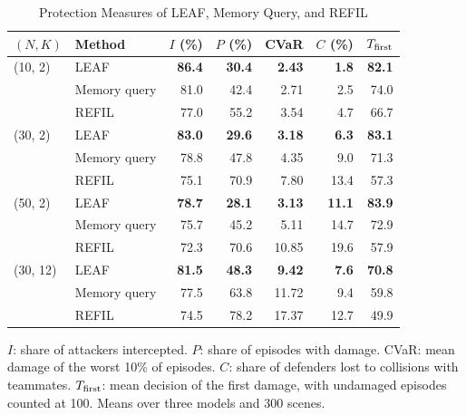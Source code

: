 \begin{table}[!t]
\centering
\scriptsize
\setlength{\tabcolsep}{2.6pt}
\caption{Protection Measures of LEAF, Memory Query, and REFIL}
\label{tab:s-protect}
\begin{tabular}{@{}llrrrrr@{}}
\toprule
$(N,K)$ & Method & $I$ (\%) & $P$ (\%) & CVaR & $C$ (\%) & $T_{\rm first}$\\
\midrule
(10, 2) & LEAF & \textbf{86.4} & \textbf{30.4} & \textbf{2.43} & \textbf{1.8} & \textbf{82.1}\\
 & Memory query & 81.0 & 42.4 & 2.71 & 2.5 & 74.0\\
 & REFIL & 77.0 & 55.2 & 3.54 & 4.7 & 66.7\\
(30, 2) & LEAF & \textbf{83.0} & \textbf{29.6} & \textbf{3.18} & \textbf{6.3} & \textbf{83.1}\\
 & Memory query & 78.8 & 47.8 & 4.35 & 9.0 & 71.3\\
 & REFIL & 75.1 & 70.9 & 7.80 & 13.4 & 57.3\\
(50, 2) & LEAF & \textbf{78.7} & \textbf{28.1} & \textbf{3.13} & \textbf{11.1} & \textbf{83.9}\\
 & Memory query & 75.7 & 45.2 & 5.11 & 14.7 & 72.9\\
 & REFIL & 72.3 & 70.6 & 10.85 & 19.6 & 57.9\\
(30, 12) & LEAF & \textbf{81.5} & \textbf{48.3} & \textbf{9.42} & \textbf{7.6} & \textbf{70.8}\\
 & Memory query & 77.5 & 63.8 & 11.72 & 9.4 & 59.8\\
 & REFIL & 74.5 & 78.2 & 17.37 & 12.7 & 49.9\\
\bottomrule
\end{tabular}
\par\smallskip
\parbox{\columnwidth}{\scriptsize $I$: share of attackers intercepted. $P$: share of episodes with damage. CVaR: mean damage of the worst 10\% of episodes. $C$: share of defenders lost to collisions with teammates. $T_{\rm first}$: mean decision of the first damage, with undamaged episodes counted at 100. Means over three models and 300 scenes.}
\end{table}


